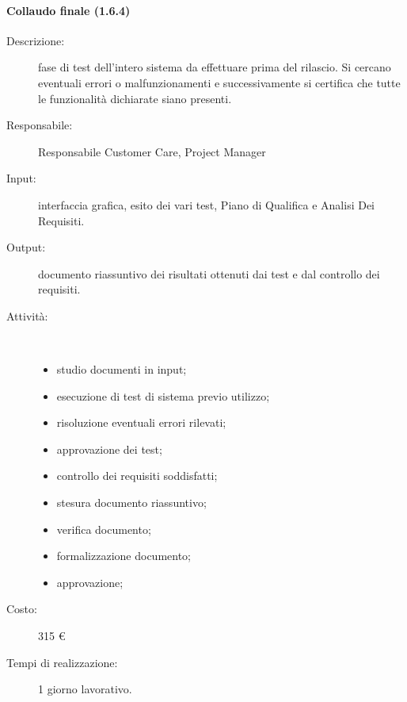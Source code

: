 \paragraph{Collaudo finale (1.6.4)}
\begin{description}
\item[Descrizione:] fase di test dell'intero sistema da effettuare prima del rilascio. Si cercano eventuali errori o malfunzionamenti e successivamente si certifica che tutte le funzionalit\`{a} dichiarate siano presenti.
\item[Responsabile:] Responsabile Customer Care, Project Manager
\item[Input:] interfaccia grafica, esito dei vari test, Piano di Qualifica e Analisi Dei Requisiti.
\item[Output:] documento riassuntivo dei risultati ottenuti dai test e dal controllo dei requisiti.
\item[Attività:]\mbox{}\\[-1.5\baselineskip]
	\begin{itemize}
	\item studio documenti in input;
	\item esecuzione di test di sistema previo utilizzo;
	\item risoluzione eventuali errori rilevati;
	\item approvazione dei test;
	\item controllo dei requisiti soddisfatti;
	\item stesura documento riassuntivo;
	\item verifica documento;
	\item formalizzazione documento;
	\item approvazione;
	\end{itemize}
\item[Costo:] 315 \euro{}
\item[Tempi di realizzazione:] 1 giorno lavorativo.
\end{description}

